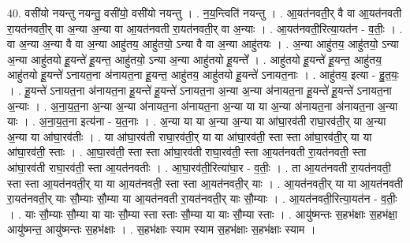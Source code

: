\documentclass[17pt]{extarticle}
\begin{document}
40. वसी॑यो नयन्तु नयन्तु॒ वसी॑यो॒ वसी॑यो नयन्तु । . न॒य॒न्त्विति॑ नयन्तु । . आ॒यत॑नवती॒र् वै वा आ॒यत॑नवती रा॒यत॑नवती॒र् वा अ॒न्या अ॒न्या वा आ॒यत॑नवती रा॒यत॑नवती॒र् वा अ॒न्याः । . आ॒यत॑नवती॒रित्या॒यत॑न - व॒तीः॒ । . वा अ॒न्या अ॒न्या वै वा अ॒न्या आहु॑तय॒ आहु॑तयो॒ ऽन्या वै वा अ॒न्या आहु॑तयः । . अ॒न्या आहु॑तय॒ आहु॑तयो॒ ऽन्या अ॒न्या आहु॑तयो हू॒यन्ते॑ हू॒यन्त॒ आहु॑तयो॒ ऽन्या अ॒न्या आहु॑तयो हू॒यन्ते᳚ । . आहु॑तयो हू॒यन्ते॑ हू॒यन्त॒ आहु॑तय॒ आहु॑तयो हू॒यन्ते॑ ऽनायत॒ना अ॑नायत॒ना हू॒यन्त॒ आहु॑तय॒ आहु॑तयो हू॒यन्ते॑ ऽनायत॒नाः । . आहु॑तय॒ इत्या - हु॒त॒यः॒ । . हू॒यन्ते॑ ऽनायत॒ना अ॑नायत॒ना हू॒यन्ते॑ हू॒यन्ते॑ ऽनायत॒ना अ॒न्या अ॒न्या अ॑नायत॒ना हू॒यन्ते॑ हू॒यन्ते॑ ऽनायत॒ना अ॒न्याः । . अ॒ना॒य॒त॒ना अ॒न्या अ॒न्या अ॑नायत॒ना अ॑नायत॒ना अ॒न्या या या अ॒न्या अ॑नायत॒ना अ॑नायत॒ना अ॒न्या याः । . अ॒ना॒य॒त॒ना इत्य॑ना - य॒त॒नाः । . अ॒न्या या या अ॒न्या अ॒न्या या आ॑घा॒रव॑ती राघा॒रव॑ती॒र् या अ॒न्या अ॒न्या या आ॑घा॒रव॑तीः । . या आ॑घा॒रव॑ती राघा॒रव॑ती॒र् या या आ॑घा॒रव॑ती॒ स्ता स्ता आ॑घा॒रव॑ती॒र् या या आ॑घा॒रव॑ती॒ स्ताः । . आ॒घा॒रव॑ती॒ स्ता स्ता आ॑घा॒रव॑ती राघा॒रव॑ती॒ स्ता आ॒यत॑नवती रा॒यत॑नवती॒ स्ता आ॑घा॒रव॑ती राघा॒रव॑ती॒ स्ता आ॒यत॑नवतीः । . आ॒घा॒रव॑ती॒रित्या॑घा॒र - व॒तीः॒ । . ता आ॒यत॑नवती रा॒यत॑नवती॒ स्ता स्ता आ॒यत॑नवती॒र् या या आ॒यत॑नवती॒ स्ता स्ता आ॒यत॑नवती॒र् याः । . आ॒यत॑नवती॒र् या या आ॒यत॑नवती रा॒यत॑नवती॒र् याः सौ॒म्याः सौ॒म्या या आ॒यत॑नवती रा॒यत॑नवती॒र् याः सौ॒म्याः । . आ॒यत॑नवती॒रित्या॒यत॑न - व॒तीः॒ । . याः सौ॒म्याः सौ॒म्या या याः सौ॒म्या स्ता स्ताः सौ॒म्या या याः सौ॒म्या स्ताः । . आयु॑ष्मन्तः स॒हभ॑क्षाः स॒हभ॑क्षा॒ आयु॑ष्मन्त॒ आयु॑ष्मन्तः स॒हभ॑क्षाः । . स॒हभ॑क्षाः स्याम स्याम स॒हभ॑क्षाः स॒हभ॑क्षाः स्याम । \newline
\end{document}
